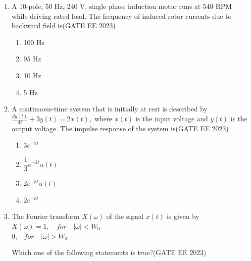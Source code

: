 \documentclass[a4paper,12pt]{exam}
\theoremstyle{remark}
\begin{document}
\begin{enumerate}
The correct matching between the elements in column \textbf{A} with those of column \textbf{B} is

\begin{multicols}{2}
\begin{enumerate}
    \item a-r, b-p, and c-q
    \item a-r, b-q, and c-p
    \item a-p, b-r, and c-q
    \item a-q, b-p, and c-r
\end{enumerate}
\end{multicols}
\item A 10-pole, 50 Hz, 240 V, single phase induction motor runs at 540 RPM while driving rated load. The frequency of induced rotor currents due to backward field is\hfill{(GATE EE 2023)}
\begin{multicols}{4}
\begin{enumerate}
    \item 100 Hz
    \item 95 Hz
    \item 10 Hz
    \item  5 Hz
\end{enumerate}
\end{multicols}
\item A continuous-time system that is initially at rest is described by
$
\frac{d y(t)}{dt} + 3y(t) = 2x(t),
$
where $x(t)$ is the input voltage and $y(t)$ is the output voltage. The impulse response of the system is\hfill{(GATE EE 2023)}

\begin{multicols}{4}
\begin{enumerate}
    \item $3e^{-2t}$
    \item $\dfrac{1}{3} e^{-2t} u(t)$
    \item $2e^{-3t} u(t)$
    \item $2e^{-3t}$
\end{enumerate}
\end{multicols}
\item The Fourier transform $X(\omega)$ of the signal $x(t)$ is given by\\
$
X(\omega) =1, \quad for \quad |\omega| < W_0$ \\
\hspace{1.3cm}0,$\quad for \quad |\omega| > W_0
$

Which one of the following statements is true?\hfill{(GATE EE 2023)}


\end{enumerate}
\end{document}
